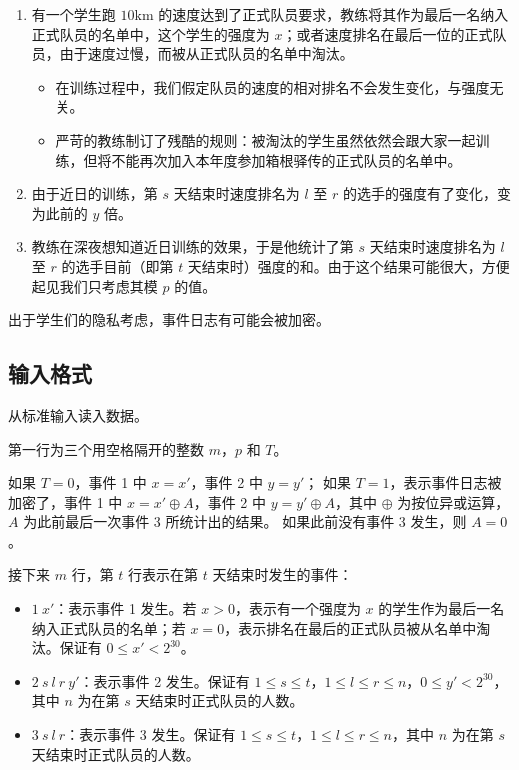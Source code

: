 \begin{enumerate}
    \item 有一个学生跑 $10\mathrm{km}$ 的速度达到了正式队员要求，教练将其作为最后一名纳入正式队员的名单中，这个学生的强度为 $x$；或者速度排名在最后一位的正式队员，由于速度过慢，而被从正式队员的名单中淘汰。
          \begin{itemize}
              \item 在训练过程中，我们假定队员的速度的相对排名不会发生变化，与强度无关。
              \item 严苛的教练制订了残酷的规则：被淘汰的学生虽然依然会跟大家一起训练，但将不能再次加入本年度参加箱根驿传的正式队员的名单中。
          \end{itemize}
    \item 由于近日的训练，第 $s$ 天结束时速度排名为 $l$ 至 $r$ 的选手的强度有了变化，变为此前的 $y$ 倍。
    \item 教练在深夜想知道近日训练的效果，于是他统计了第 $s$ 天结束时速度排名为 $l$ 至 $r$ 的选手目前（即第 $t$ 天结束时）强度的和。由于这个结果可能很大，方便起见我们只考虑其模 $p$ 的值。
\end{enumerate}
出于学生们的隐私考虑，事件日志有可能会被加密。

\subsection*{输入格式}

从标准输入读入数据。

第一行为三个用空格隔开的整数 $m$，$p$ 和 $T$。

如果 $T = 0$，事件 1 中 $x = x'$，事件 2 中 $y = y'$；
如果 $T = 1$，表示事件日志被加密了，事件 1 中 $x = x' \oplus A$，事件 2 中 $y = y' \oplus A$，其中 $\oplus$ 为按位异或运算，$A$ 为此前最后一次事件 3 所统计出的结果。
如果此前没有事件 3 发生，则 $A = 0$。

接下来 $m$ 行，第 $t$ 行表示在第 $t$ 天结束时发生的事件：

\begin{itemize}
    \item $1 \ x'$：表示事件 1 发生。若 $x > 0$，表示有一个强度为 $x$ 的学生作为最后一名纳入正式队员的名单；若 $x = 0$，表示排名在最后的正式队员被从名单中淘汰。保证有 $0 \le x' < 2^{30}$。
    \item $2 \ s \ l \ r \ y'$：表示事件 2 发生。保证有 $1 \le s \le t$，$1 \le l \le r \le n$，$0 \le y' < 2^{30}$，其中 $n$ 为在第 $s$ 天结束时正式队员的人数。
    \item $3 \ s \ l \ r$：表示事件 3 发生。保证有 $1 \le s \le t$，$1 \le l \le r \le n$，其中 $n$ 为在第 $s$ 天结束时正式队员的人数。
\end{itemize}


